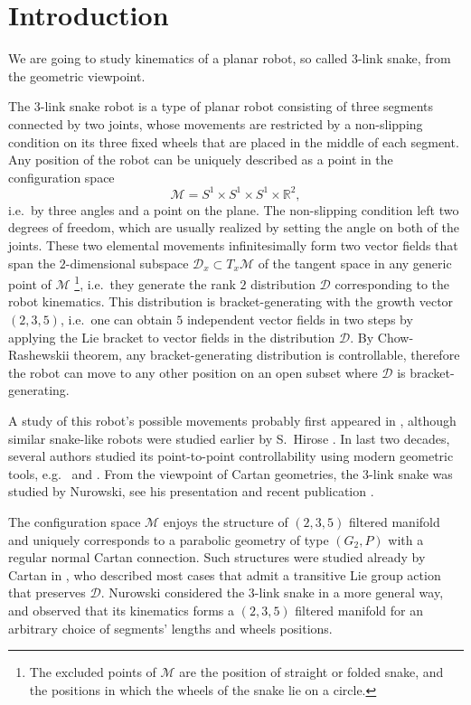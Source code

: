 \documentclass{amsart}
\theoremstyle{plain}
\theoremstyle{definition}
\theoremstyle{remark}
\newcommand{\R}{\mathbb{R}}
\newcommand{\mc}[1]{\mathcal{#1}}
\begin{document}
\maketitle

\section{Introduction}

We are going to study kinematics of a planar robot, so called $3$-link snake, from the geometric viewpoint.

The $3$-link snake robot is a type of planar robot consisting of three segments connected by two joints, whose movements are restricted by a non-slipping condition on its three fixed wheels that are placed in the middle of each segment. Any position of the robot can be uniquely described as a point in the configuration space
\[ \mc{M} = S^1 \times S^1 \times S^1 \times \R^2,\]
i.e.~by three angles and a point on the plane. The non-slipping condition left two degrees of freedom, which are usually realized by setting the angle on both of the joints. These two elemental movements infinitesimally form two vector fields that span the $2$-dimensional subspace $\mc{D}_x \subset T_x\mc{M}$ of the tangent space in any generic point of $\mc{M}$%
\footnote{The excluded points of $\mc{M}$ are the position of straight or folded snake, and the positions in which the wheels of the snake lie on a circle.},
i.e.~they generate the rank $2$ distribution $\mc{D}$ corresponding to the robot kinematics. This distribution is bracket-generating with the growth vector $(2,3,5)$, i.e.~one can obtain $5$ independent vector fields in two steps by applying the Lie bracket to vector fields in the distribution $\mc{D}$. By Chow-Rashewskii theorem, any bracket-generating distribution is controllable, therefore the robot can move to any other position on an open subset where $\mc{D}$ is bracket-generating.

A study of this robot's possible movements probably first appeared in \cite{pptm1999}, although similar snake-like robots were studied earlier by S.~Hirose \cite{sh1993}. In last two decades, several authors studied its point-to-point controllability using modern geometric tools, e.g.~\cite{mi2009} and \cite{jhanpv2016}. From the viewpoint of Cartan geometries, the $3$-link snake was studied by Nurowski, see his presentation \cite{pn2014} and recent publication \cite{tf2024}.

The configuration space $\mc{M}$ enjoys the structure of $(2,3,5)$ filtered manifold and uniquely corresponds to a parabolic geometry of type $(G_2,P)$ with a regular normal Cartan connection. Such structures were studied already by Cartan in \cite{ec1910}, who described most cases that admit a transitive Lie group action that preserves $\mc{D}$. Nurowski considered the $3$-link snake in a more general way, and observed that its kinematics forms a $(2,3,5)$ filtered manifold for an arbitrary choice of segments' lengths and wheels positions.
\end{document}
